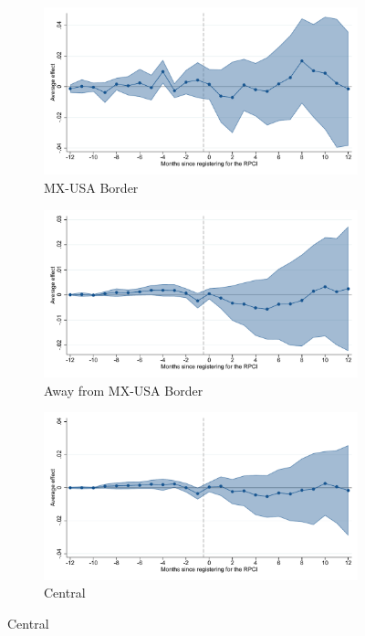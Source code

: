\begin{figure}[H]
    \centering
    \caption{Event studies - RPCI effect on enrollment}
    
    \begin{subfigure}{0.32\textwidth}
    \caption{MX-USA Border}
    \includegraphics[width=\textwidth]{04_Figures/muestra_10porciento/event_study_alta_frontera_dcdh_connected.pdf}
    \end{subfigure}
    \begin{subfigure}{0.32\textwidth}
    \caption{Away from MX-USA Border}
    \includegraphics[width=\textwidth]{04_Figures/muestra_10porciento/event_study_alta_no_frontera_dcdh_connected.pdf}
    \end{subfigure}
    \begin{subfigure}{0.32\textwidth}
    \caption{Central}
    \includegraphics[width=\textwidth]{04_Figures/muestra_10porciento/event_study_alta_reg_centro_dcdh_connected.pdf}
    \end{subfigure}
    

\end{figure}
